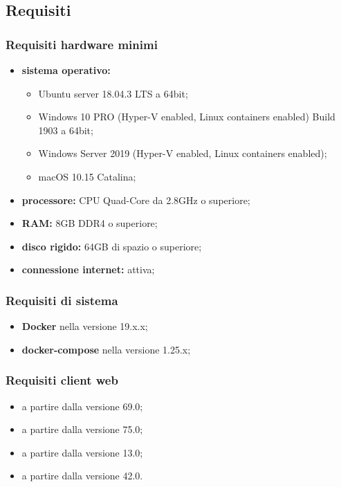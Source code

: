 \subsection{Requisiti}
	\subsubsection{Requisiti hardware minimi}
		\begin{itemize}
			\item \textbf{sistema operativo:} 
			\begin{itemize}
				\item Ubuntu server 18.04.3 LTS a 64bit;
				\item Windows 10 PRO (Hyper-V enabled, Linux containers enabled) Build 1903 a 64bit; 
				\item Windows Server 2019 (Hyper-V enabled, Linux containers enabled);
				\item macOS 10.15 Catalina;
			\end{itemize}
			\item \textbf{processore:} CPU Quad-Core da 2.8GHz o superiore;
			\item \textbf{RAM:} 8GB DDR4 o superiore;
			\item \textbf{disco rigido:} 64GB di spazio o superiore;
			\item \textbf{connessione internet:} attiva;
		\end{itemize}
	\subsubsection{Requisiti di sistema}
		\begin{itemize}
			\item \textbf{Docker} nella versione 19.x.x;
			\item \textbf{docker-compose} nella versione 1.25.x;
		\end{itemize}
	\subsubsection{Requisiti client web}
		\begin{itemize}
		 	\item {} a partire dalla versione 69.0;
		 	\item {} a partire dalla versione 75.0;
		 	\item {} a partire dalla versione 13.0;
		 	\item {} a partire dalla versione 42.0.
		\end{itemize} 

